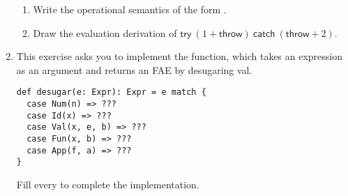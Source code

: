 \begin{enumerate}
\begin{enumerate}
    \item Write the operational semantics of the form
    .
    \item Draw the evaluation derivation of $\textsf{try}\ (1 + \textsf{throw})\ \textsf{catch}\ (\textsf{throw} + 2)$.
\end{enumerate}

\item This exercise asks you to implement the  function, which
  takes an \lang expression as an argument and returns an \textsf{FAE} by
  desugaring \textsf{val}.

\begin{verbatim}
def desugar(e: Expr): Expr = e match {
  case Num(n) => ???
  case Id(x) => ???
  case Val(x, e, b) => ???
  case Fun(x, b) => ???
  case App(f, a) => ???
}
\end{verbatim}

Fill every  to complete the implementation.

\end{enumerate}
